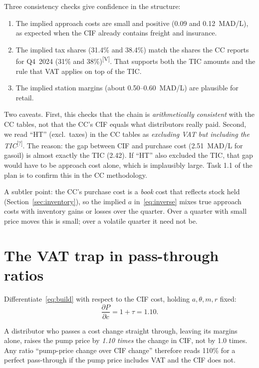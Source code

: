 \documentclass[11pt,a4paper]{article}
\newcommand{\tagV}{\textsuperscript{\textcolor{green!50!black}{\textsf{\scriptsize[V]}}}}
\newcommand{\tagQ}{\textsuperscript{\textcolor{red!70!black}{\textsf{\scriptsize[?]}}}}
\theoremstyle{definition}
\begin{document}
Three consistency checks give confidence in the structure:
\begin{enumerate}
\item The implied approach costs are small and positive (0.09 and 0.12~MAD/L), as expected when the CIF already
  contains freight and insurance.
\item The implied tax shares (31.4\% and 38.4\%) match the shares the CC reports for Q4~2024 (31\% and 38\%)\tagV.
  That supports both the TIC amounts and the rule that VAT applies on top of the TIC.
\item The implied station margins (about 0.50--0.60~MAD/L) are plausible for retail.
\end{enumerate}

\begin{warning}
Two caveats. First, this checks that the chain is \emph{arithmetically consistent} with the CC tables, not that the
CC's CIF equals what distributors really paid. Second, we read ``HT'' (excl.\ taxes) in the CC tables as
\emph{excluding VAT but including the TIC}\tagQ. The reason: the gap between CIF and purchase cost (2.51~MAD/L for gasoil) is almost exactly the
TIC (2.42). If ``HT'' also excluded the TIC, that gap would have to be approach cost alone, which is implausibly large. Task 1.1 of the
plan is to confirm this in the CC methodology.

A subtler point: the CC's purchase cost is a \emph{book} cost that reflects stock held (Section~\ref{sec:inventory}), so the implied
$a$ in~\eqref{eq:inverse} mixes true approach costs with inventory gains or losses over the quarter. Over a quarter with small price moves
this is small; over a volatile quarter it need not be.
\end{warning}

\section{The VAT trap in pass-through ratios}\label{sec:vat}

Differentiate~\eqref{eq:build} with respect to the CIF cost, holding $a,\theta,m,r$ fixed:
\begin{equation}\label{eq:dPdc}
\frac{\partial P}{\partial c} = 1+\tau = 1.10 .
\end{equation}

\begin{keyidea}
A distributor who passes a cost change straight through, leaving its margins alone, raises the pump price by
\emph{1.10 times} the change in CIF, not by 1.0 times. Any ratio ``pump-price change over CIF change''
therefore reads 110\% for a perfect pass-through if the pump price includes VAT and the CIF does not.
\end{keyidea}
\end{document}
